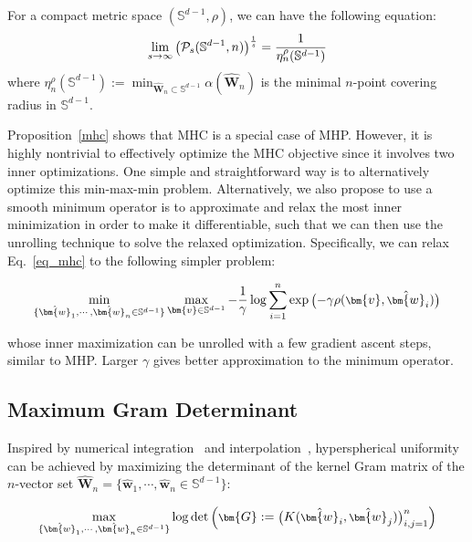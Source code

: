 \begin{proposition}\label{mhc}
For a compact metric space $(\mathbb{S}^{d-1},\rho)$, we can have the following equation:
\begin{equation}
\footnotesize
    \lim_{s\rightarrow\infty}\big(\mathcal{P}_s(\mathbb{S}^{d-1},n)\big)^{\frac{1}{s}}=\frac{1}{\eta_n^\rho(\mathbb{S}^{d-1})}
\end{equation}
where $\eta_n^\rho(\mathbb{S}^{d-1}):=\min_{\hat{\bm{W}}_n\subset\mathbb{S}^{d-1}}\alpha(\hat{\bm{W}}_n)$ is the minimal $n$-point covering radius in $\mathbb{S}^{d-1}$.
\end{proposition}

Proposition~\ref{mhc} shows that MHC is a special case of MHP. However, it is highly nontrivial to effectively optimize the MHC objective since it involves two inner optimizations. One simple and straightforward way is to alternatively optimize this min-max-min problem. Alternatively, we also propose to use a smooth minimum operator is to approximate and relax the most inner minimization in order to make it differentiable, such that we can then use the unrolling technique to solve the relaxed optimization. Specifically, we can relax Eq.~\ref{eq_mhc} to the following simpler problem:

\begin{equation}\label{eq_mhc2}
\footnotesize
    \min_{\{\hat{\bm{w}}_1,\cdots,\hat{\bm{w}}_n\in\mathbb{S}^{d-1}\}}\max_{\bm{v}\in\mathbb{S}^{d-1}}-\frac{1}{\gamma}\log \sum_{i=1}^n \exp\big({-\gamma \rho(\bm{v},\hat{\bm{w}}_i)}\big)
\end{equation}

whose inner maximization can be unrolled with a few gradient ascent steps, similar to MHP. Larger $\gamma$ gives better approximation to the minimum operator.

\subsection{Maximum Gram Determinant}

Inspired by numerical integration~\cite{sloan2004extremal} and interpolation~\cite{karvonen2020kernel}, hyperspherical uniformity can be achieved by maximizing the determinant of the kernel Gram matrix of the $n$-vector set $\hat{\bm{W}}_n=\{\hat{\bm{w}}_1,\cdots,\hat{\bm{w}}_n\in\mathbb{S}^{d-1}\}$:

\begin{equation}
\footnotesize
    \max_{\{\hat{\bm{w}}_1,\cdots,\hat{\bm{w}}_n\in\mathbb{S}^{d-1}\}}\log\det\bigg(\bm{G}:=\big(K(\hat{\bm{w}}_i,\hat{\bm{w}}_j)\big)_{i,j=1}^n\bigg)
\end{equation}

